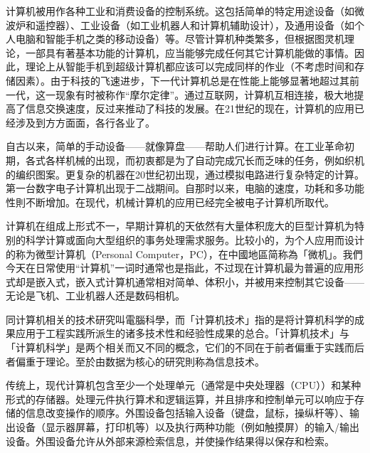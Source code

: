 \documentclass[oneside,a4paper,12pt]{book}%
\begin{document}
{计算机被用作各种工业和消费设备的控制系统。这包括简单的特定用途设备（如微波炉和遥控器）、工业设备（如工业机器人和计算机辅助设计），及通用设备（如个人电脑和智能手机之类的移动设备）等。尽管计算机种类繁多，但根据图灵机理论，一部具有著基本功能的计算机，应当能够完成任何其它计算机能做的事情。因此，理论上从智能手机到超级计算机都应该可以完成同样的作业（不考虑时间和存储因素）。由于科技的飞速进步，下一代计算机总是在性能上能够显著地超过其前一代，这一现象有时被称作“摩尔定律”。通过互联网，计算机互相连接，极大地提高了信息交换速度，反过来推动了科技的发展。在21世纪的现在，计算机的应用已经涉及到方方面面，各行各业了。

自古以来，简单的手动设备——就像算盘——帮助人们进行计算。在工业革命初期，各式各样机械的出现，而初衷都是为了自动完成冗长而乏味的任务，例如织机的编织图案。更复杂的机器在20世纪初出现，通过模拟电路进行复杂特定的计算。第一台数字电子计算机出现于二战期间。自那时以来，电脑的速度，功耗和多功能性則不断增加。在现代，机械计算机的应用已经完全被电子计算机所取代。

计算机在组成上形式不一，早期计算机的天依然有大量体积庞大的巨型计算机为特别的科学计算或面向大型组织的事务处理需求服务。比较小的，为个人应用而设计的称为微型计算机（Personal Computer，PC），在中國地區简称為「微机」。我們今天在日常使用“计算机”一词时通常也是指此，不过现在计算机最为普遍的应用形式却是嵌入式，嵌入式计算机通常相对简单、体积小，并被用来控制其它设备——无论是飞机、工业机器人还是数码相机。

同计算机相关的技术研究叫電腦科學，而「计算机技术」指的是将计算机科学的成果应用于工程实践所派生的诸多技术性和经验性成果的总合。「计算机技术」与「计算机科学」是两个相关而又不同的概念，它们的不同在于前者偏重于实践而后者偏重于理论。至於由数据为核心的研究則称為信息技术。

传统上，现代计算机包含至少一个处理单元（通常是中央处理器（CPU））和某种形式的存储器。处理元件执行算术和逻辑运算，并且排序和控制单元可以响应于存储的信息改变操作的顺序。外围设备包括输入设备（键盘，鼠标，操纵杆等）、输出设备（显示器屏幕，打印机等）以及执行两种功能（例如触摸屏）的输入/输出设备。外围设备允许从外部来源检索信息，并使操作结果得以保存和检索。
}

\end{document}
